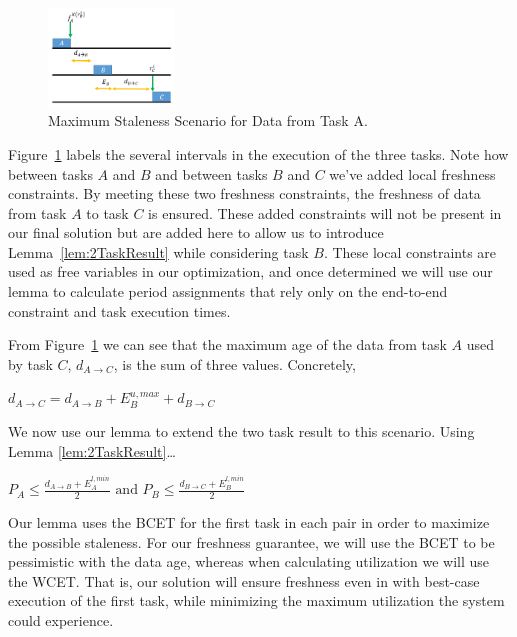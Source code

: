 \begin{figure}[!ht]
	\centering
	\includegraphics[width=0.3\textwidth]{figures/3TaskMaxStaleness}
	\caption{Maximum Staleness Scenario for Data from Task A.}
	\label{fig:3Tasks}
\end{figure}

Figure~\ref{fig:3Tasks} labels the several intervals in the execution of the three tasks. Note how between tasks $A$ and $B$ and between tasks $B$ and $C$ we've added local freshness constraints. By meeting these two freshness constraints, the freshness of data from task $A$ to task $C$ is ensured. These added constraints will not be present in our final solution but are added here to allow us to introduce Lemma~\ref{lem:2TaskResult} while considering task $B$. These local constraints are used as free variables in our optimization, and once determined we will use our lemma to calculate period assignments that rely only on the end-to-end constraint and task execution times.

From Figure~\ref{fig:3Tasks} we can see that the maximum age of the data from task $A$ used by task $C$, $d_{A \to C}$, is the sum of three values. Concretely,

\begin{center}
	$d_{A \to C} = d_{A \to B} + E^{u,max}_B + d_{B \to C}$
\end{center}

We now use our lemma to extend the two task result to this scenario. Using Lemma \ref{lem:2TaskResult}\ldots

\begin{center}
	$P_A \leq \frac{d_{A \to B} + E^{l,min}_A}{2} \text{ and } P_B \leq \frac{d_{B \to C} + E^{l,min}_B}{2}$
\end{center}

Our lemma uses the BCET for the first task in each pair in order to maximize the possible staleness. For our freshness guarantee, we will use the BCET to be pessimistic with the data age, whereas when calculating utilization we will use the WCET. That is, our solution will ensure freshness even in with best-case execution of the first task, while minimizing the maximum utilization the system could experience.

